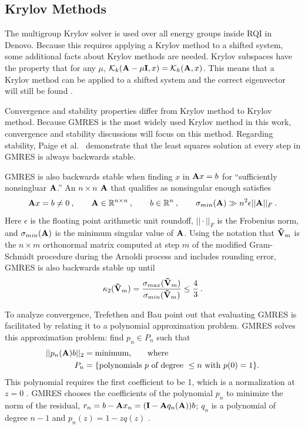 \subsection{Krylov Methods}
The multigroup Krylov solver is used over all energy groups inside RQI in Denovo. Because this requires applying a Krylov method to a shifted system, some additional facts about Krylov methods are needed. Krylov subspaces have the property that for any $\mu$, $\mathcal{K}_k(\mathbf{A}- \mu \mathbf{I}, x) = \mathcal{K}_k(\mathbf{A},x)$. This means that a Krylov method can be applied to a shifted system and the correct eigenvector will still be found \cite{Stewart2001}. 

Convergence and stability properties differ from Krylov method to Krylov method. Because GMRES is the most widely used Krylov method in this work, convergence and stability discussions will focus on this method. Regarding stability, Paige et al.\  \cite{Paige2006} demonstrate that the least squares solution at every step in GMRES is always backwards stable. 

GMRES is also backwards stable when finding $x$ in $\mathbf{A}x = b$ for ``sufficiently nonsingluar $\mathbf{A}$.'' An $n \times n$ $\mathbf{A}$ that qualifies as nonsingular enough satisfies
%
\begin{equation}
  \mathbf{A}x = b \ne 0\:, \qquad \mathbf{A} \in \mathbb{R}^{n \times n} \:, \qquad b\in \mathbb{R}^{n} \:, \qquad \sigma_{min}(\mathbf{A}) \gg n^{2}\epsilon ||\mathbf{A}||_{F} \:.
\end{equation}
%
Here $\epsilon$ is the floating point arithmetic unit roundoff, $|| \cdot ||_{F}$ is the Frobenius norm, and $\sigma_{min}(\mathbf{A})$ is the minimum singular value of $\mathbf{A}$. Using the notation that $\mathbf{\tilde V}_{m}$ is the $n \times m$ orthonormal matrix computed at step $m$ of the modified Gram-Schmidt procedure during the Arnoldi process and includes rounding error, GMRES is also backwards stable up until  \cite{Paige2006}
%
\begin{equation}
  \kappa_{2}(\mathbf{\tilde V}_{m}) = \frac{\sigma_{max}(\mathbf{\tilde V}_{m})}{\sigma_{min}(\mathbf{\tilde V}_{m})} \le \frac{4}{3} \:.
\end{equation}

To analyze convergence, Trefethen and Bau \cite{Trefethen1997} point out that evaluating GMRES is facilitated by relating it to a polynomial approximation problem. GMRES solves this approximation problem: find $p_{n} \in P_{n}$ such that 
%
\begin{align}
  ||p_{n}(\mathbf{A})b||_{2} &= \text{minimum,} \qquad \text{where}  \nonumber \\
  P_{n} &= \{ \text{polynomials } p \text{ of degree } \le n \text{ with } p(0)=1 \nonumber \}.
\end{align}
%
This polynomial requires the first coefficient to be 1, which is a normalization at $z=0$ . GMRES chooses the coefficients of the polynomial $p_{n}$ to minimize the norm of the residual, $r_{n} = b - \mathbf{A}x_{n} = (\mathbf{I} - \mathbf{A}q_{n} (\mathbf{A}) )b$; $q_{n}$ is a polynomial of degree $n-1$ and $p_{n}(z) = 1 - zq(z)$ \cite{Trefethen1997}.

